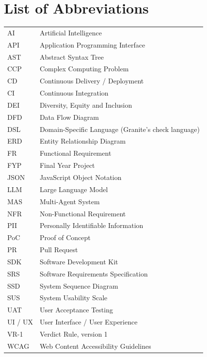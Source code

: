 \chapter*{List of Abbreviations}

\begin{tabular}{ll}
AI & Artificial Intelligence\\
API & Application Programming Interface\\
AST & Abstract Syntax Tree\\
CCP & Complex Computing Problem\\
CD & Continuous Delivery / Deployment\\
CI & Continuous Integration\\
DEI & Diversity, Equity and Inclusion\\
DFD & Data Flow Diagram\\
DSL & Domain-Specific Language (Granite's check language)\\
ERD & Entity Relationship Diagram\\
FR & Functional Requirement\\
FYP & Final Year Project\\
JSON & JavaScript Object Notation\\
LLM & Large Language Model\\
MAS & Multi-Agent System\\
NFR & Non-Functional Requirement\\
PII & Personally Identifiable Information\\
PoC & Proof of Concept\\
PR & Pull Request\\
SDK & Software Development Kit\\
SRS & Software Requirements Specification\\
SSD & System Sequence Diagram\\
SUS & System Usability Scale\\
UAT & User Acceptance Testing\\
UI / UX & User Interface / User Experience\\
VR-1 & Verdict Rule, version 1\\
WCAG & Web Content Accessibility Guidelines\\
\end{tabular}
